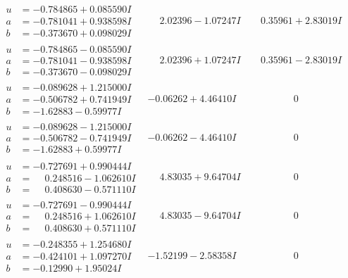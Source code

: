 \documentclass[1p]{elsarticle_modified}
\theoremstyle{definition}
\begin{document}
$$\begin{array}{c|c|c}
\begin{aligned}
u &= -0.784865 + 0.085590 I \\
a &= -0.781041 + 0.938598 I \\
b &= -0.373670 + 0.098029 I\end{aligned}
 & \phantom{-}2.02396 - 1.07247 I & \phantom{-}0.35961 + 2.83019 I \\ \hline\begin{aligned}
u &= -0.784865 - 0.085590 I \\
a &= -0.781041 - 0.938598 I \\
b &= -0.373670 - 0.098029 I\end{aligned}
 & \phantom{-}2.02396 + 1.07247 I & \phantom{-}0.35961 - 2.83019 I \\ \hline\begin{aligned}
u &= -0.089628 + 1.215000 I \\
a &= -0.506782 + 0.741949 I \\
b &= -1.62883 - 0.59977 I\end{aligned}
 & -0.06262 + 4.46410 I & \phantom{-0.000000 } 0 \\ \hline\begin{aligned}
u &= -0.089628 - 1.215000 I \\
a &= -0.506782 - 0.741949 I \\
b &= -1.62883 + 0.59977 I\end{aligned}
 & -0.06262 - 4.46410 I & \phantom{-0.000000 } 0 \\ \hline\begin{aligned}
u &= -0.727691 + 0.990444 I \\
a &= \phantom{-}0.248516 - 1.062610 I \\
b &= \phantom{-}0.408630 - 0.571110 I\end{aligned}
 & \phantom{-}4.83035 + 9.64704 I & \phantom{-0.000000 } 0 \\ \hline\begin{aligned}
u &= -0.727691 - 0.990444 I \\
a &= \phantom{-}0.248516 + 1.062610 I \\
b &= \phantom{-}0.408630 + 0.571110 I\end{aligned}
 & \phantom{-}4.83035 - 9.64704 I & \phantom{-0.000000 } 0 \\ \hline\begin{aligned}
u &= -0.248355 + 1.254680 I \\
a &= -0.424101 + 1.097270 I \\
b &= -0.12990 + 1.95024 I\end{aligned}
 & -1.52199 - 2.58358 I & \phantom{-0.000000 } 0 \\ \hline\begin{aligned}

\end{aligned}
\end{array}$$
\end{document}
